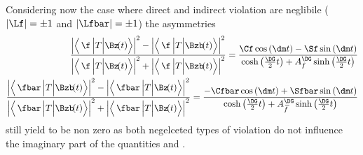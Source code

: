 Considering now the case where direct and indirect \CP violation are neglibile ($\left|\Lf\right|=\pm1$ and $\left|\Lfbar\right|=\pm1$) the asymmetries
\begin{align}
\frac{\left|\left<\,\f\,\Big|T\Big|\Bz\!(t)\right>\right|^2 - \left|\left<\,\f\,\Big|T\Big|\Bzb\!(t)\right>\right|^2}{\left|\left<\,\f\,\Big|T\Big|\Bz\!(t)\right>\right|^2 + \left|\left<\,\f\,\Big|T\Big|\Bzb\!(t)\right>\right|^2}
= \frac{\Cf\cos\left(\dm t\right) - \Sf\sin\left(\dm t\right)}{\cosh\left(\frac{\DG}{2}t\right) + A_f^{\DG}\sinh\left(\frac{\DG}{2}t\right)}\\
\frac{\left|\left<\,\fbar\,\Big|T\Big|\Bzb\!(t)\right>\right|^2 - \left|\left<\,\fbar\,\Big|T\Big|\Bz\!(t)\right>\right|^2}{\left|\left<\,\fbar\,\Big|T\Big|\Bzb\!(t)\right>\right|^2 + \left|\left<\,\fbar\,\Big|T\Big|\Bz\!(t)\right>\right|^2} = \frac{-\Cfbar\cos\left(\dm t\right) + \Sfbar\sin\left(\dm t\right)}{\cosh\left(\frac{\DG}{2}t\right) + A_{\kern 1.5pt\overline{\kern -1.5pt f\kern 1.5pt}}^{\DG}\sinh\left(\frac{\DG}{2}t\right)}
\end{align}
still yield to be non zero as both negelceted types of \CP violation do not influence the imaginary part of the quantities \Lf and \Lfbar.
